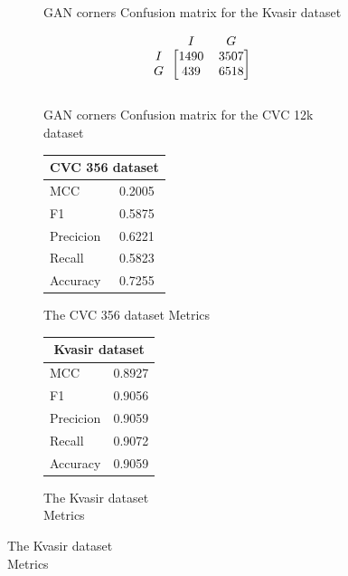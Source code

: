 \begin{figure}[h]
\begin{subfigure}[b]{0.49\textwidth}
        
\caption{GAN corners Confusion matrix for the Kvasir dataset}
\label{mat:kvasir_CM_IRV2_GAN_CORNER}
\end{subfigure}
\begin{subfigure}[b]{0.25\textwidth}
        \[
\begin{blockarray}{ccc}
& I & G  \\
\begin{block}{c[cc]}
 		I&1490 & 3507\\
        G&439  & 6518\\
\end{block}
\end{blockarray}
\]   
\caption{GAN corners Confusion matrix for the CVC 12k dataset}
\label{mat:cvc12k_CM_IRV2_GAN_CORNER}
\end{subfigure}
\caption{Confusion matrices for the three datasets}
\label{mat:CM_IRV2_GAN_CORNER}
\begin{subfigure}[b]{0.25\textwidth}
\begin{tabular}{ll}      
        \toprule
        \multicolumn{2}{c}{CVC 356 dataset}        \\
        \midrule
        MCC 		& 0.2005 \\
        F1  		& 0.5875 \\
        Precicion  	& 0.6221 \\
        Recall     	& 0.5823 \\
        Accuracy	& 0.7255 \\
        \bottomrule
        \end{tabular}
\caption{The CVC 356 dataset Metrics}
\label{tab:cvc356_metrics_IRV2_GAN_CORNER}
\end{subfigure}%
\begin{subfigure}[b]{0.49\textwidth}
    	\centering
        \begin{tabular}{ll}
        \toprule
        \multicolumn{2}{c}{Kvasir dataset}        \\
        \midrule
        MCC 		& 0.8927 \\
        F1  		& 0.9056 \\
        Precicion  	& 0.9059 \\
        Recall     	& 0.9072 \\
        Accuracy	& 0.9059 \\
        \bottomrule
\end{tabular}
\caption{The Kvasir dataset\\ Metrics}
\label{tab:kvasir_metrics_IRV2_GAN_CORNER}
\end{subfigure}%

\end{figure}
